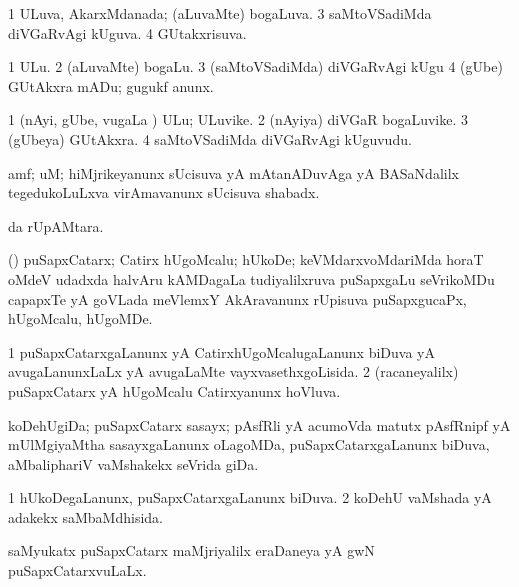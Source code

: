 {\bentry
{} 
\gl{\gu}
\expl{}
\bmng
\bnum
\num{1} ULuva, AkarxMdanada; (aLuvaMte) bogaLuva. 
\num{3} saMtoVSadiMda diVGaRvAgi kUguva. 
\num{4} GUtakxrisuva. 
\enum
\emng
\eentry

\bentry
{}
\gl{\akirx}
\expl{}
\bmng
\bnum
\num{1} ULu. 
\num{2} (aLuvaMte) bogaLu. 
\num{3} (saMtoVSadiMda) diVGaRvAgi kUgu 
\num{4} (gUbe) GUtAkxra mADu; gugukf anunx. 
\enum
\emng
\eentry

\bentry
{} 
\gl{\nA}
\expl{}
\bmng
\bnum
\num{1} (nAyi, gUbe, \mo vugaLa \vi) ULu; ULuvike. 
\num{2} (nAyiya) diVGaR bogaLuvike. 
\num{3} (gUbeya) GUtAkxra. 
\num{4} saMtoVSadiMda diVGaRvAgi kUguvudu. 
\enum
\emng
\eentry

\bentry
{}
\gl{\BAavayx}
\bmng
amf; uM; hiMjrikeyanunx sUcisuva yA mAtanADuvAga yA BASaNdalilx tegedukoLuLxva virAmavanunx sUcisuva shabadx. 
\emng
\eentry

\bentry
{}
\gl{\uparx}
\expl{}
\bmng
{} \uparx da rUpAMtara. 
\emng
\eentry

\bentry
{} 
\gl{\nA}
\expl{}
\bmng
(\savi) puSapxCatarx; Catirx hUgoMcalu; hUkoDe; keVMdarxvoMdariMda horaT oMdeV udadxda halvAru kAMDagaLa tudiyalilxruva puSapxgaLu seVrikoMDu capapxTe yA goVLada meVlemxY AkAravanunx rUpisuva puSapxgucaPx, hUgoMcalu, hUgoMDe. 
\emng
\eentry

\bentry
{} 
\gl{\gu}
\expl{}
\bmng
{} 
\emng
\eentry

\bentry
{}
\gl{\gu}
\expl{}
\bmng
\bnum
\num{1} puSapxCatarxgaLanunx yA CatirxhUgoMcalugaLanunx biDuva yA avugaLanunxLaLx yA avugaLaMte vayxvasethxgoLisida. 
\num{2} (racaneyalilx) puSapxCatarx yA hUgoMcalu Catirxyanunx hoVluva. 
\enum
\emng
\eentry

\bentry
{} 
\gl{\gu}
\expl{}
\bmng
koDehUgiDa; puSapxCatarx sasayx; pAsfRli yA acumoVda matutx pAsfRnipf yA mUlMgiyaMtha sasayxgaLanunx oLagoMDa, puSapxCatarxgaLanunx biDuva, aMbaliphariV vaMshakekx seVrida giDa. 
\emng
\eentry

\bentry
{} 
\gl{\gu}
\expl{}
\bmng
\bnum
\num{1} hUkoDegaLanunx, puSapxCatarxgaLanunx biDuva. 
\num{2} koDehU vaMshada yA adakekx saMbaMdhisida. 
\enum
\emng
\eentry

\bentry
{} 
\gl{\gu}
\expl{}
\bmng
saMyukatx puSapxCatarx maMjriyalilx eraDaneya yA gwN puSapxCatarxvuLaLx. 
\emng
\eentry

}

